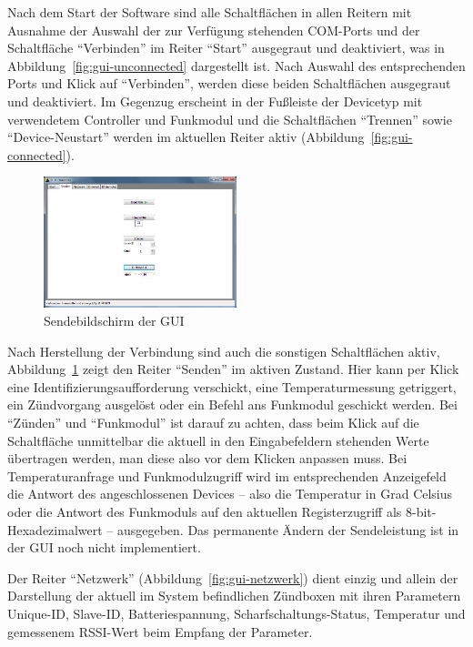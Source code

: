 \documentclass[pdftex, parskip, numbers=noenddot, toc=listof]{scrbook}
\begin{document}
	Nach dem Start der Software sind alle Schaltflächen in allen Reitern mit Ausnahme der Auswahl der zur Verfügung stehenden COM-Ports und der Schaltfläche \enquote{Verbinden} im Reiter \enquote{Start} ausgegraut und deaktiviert, was in Abbildung~\ref{fig:gui-unconnected} dargestellt ist. Nach Auswahl des entsprechenden Ports und Klick auf \enquote{Verbinden}, werden diese beiden Schaltflächen ausgegraut und deaktiviert. Im Gegenzug erscheint in der Fußleiste der Devicetyp mit verwendetem Controller und Funkmodul und die Schaltflächen \enquote{Trennen} sowie \enquote{Device-Neustart} werden im aktuellen Reiter aktiv (Abbildung~\ref{fig:gui-connected}).%
	\begin{figure}[!b]
		\centering
		\includegraphics[width=0.5\textwidth]{bilder/gui-senden}
		\caption{Sendebildschirm der GUI}
		\label{fig:gui-senden}
	\end{figure}

	Nach Herstellung der Verbindung sind auch die sonstigen Schaltflächen aktiv, Abbildung~\ref{fig:gui-senden} zeigt den Reiter \enquote{Senden} im aktiven Zustand. Hier kann per Klick eine Identifizierungsaufforderung verschickt, eine Temperaturmessung getriggert, ein Zündvorgang ausgelöst oder ein Befehl ans Funkmodul geschickt werden. Bei \enquote{Zünden} und \enquote{Funkmodul} ist darauf zu achten, dass beim Klick auf die Schaltfläche unmittelbar die aktuell in den Eingabefeldern stehenden Werte übertragen werden, man diese also vor dem Klicken anpassen muss. Bei Temperaturanfrage und Funkmodulzugriff wird im entsprechenden Anzeigefeld die Antwort des angeschlossenen Devices -- also die Temperatur in Grad Celsius oder die Antwort des Funkmoduls auf den aktuellen Registerzugriff als 8-bit-Hexadezimalwert -- ausgegeben. Das permanente Ändern der Sendeleistung ist in der GUI noch nicht implementiert.

	Der Reiter \enquote{Netzwerk} (Abbildung~\ref{fig:gui-netzwerk}) dient einzig und allein der Darstellung der aktuell im System befindlichen Zündboxen mit ihren Parametern Unique-ID, Slave-ID, Batteriespannung, Scharf\-schaltungs-Status, Temperatur und gemessenem RSSI-Wert beim Empfang der Parameter.
\end{document}
